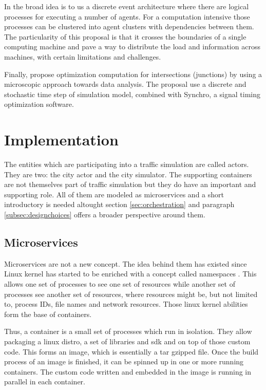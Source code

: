 \documentclass[conference]{IEEEtran}
\begin{document}
In \cite{8569576} the broad idea is to us a discrete event architecture where there are logical processes for executing a number of agents. For a computation intensive those processes can be clustered into agent clusters with dependencies between them. The particularity of this proposal is that it crosses the boundaries of a single computing machine and pave a way to distribute the load and information across machines, with certain limitations and challenges.

Finally, \cite{6244609} propose optimization computation for intersections (junctions) by using a microscopic approach towards data analysis. The proposal use a discrete and stochastic time step of simulation model, combined with Synchro, a signal timing optimization software.

\section{Implementation}
\label{sec:implementation}

The entities which are participating into a traffic simulation are called actors. They are two: the city actor and the city simulator. The supporting containers are not themselves part of traffic simulation but they do have an important and supporting role. All of them are modeled as microservices and a short introductory is needed altought section \ref{sec:orchestration} and paragraph \ref{subsec:designchoices} offers a broader perspective around them.

\subsection{Microservices}

Microservices are not a new concept. The idea behind them has existed since Linux kernel has started to be enriched with a concept called namespaces \citep{wiki:linuxns}. This allows one set of processes to see one set of resources while another set of processes see another set of resources, where resources might be, but not limited to, process IDs, file names and network resources. Those linux kernel abilities form the base of containers.

Thus, a container is a small set of processes which run in isolation. They allow packaging a linux distro, a set of libraries and sdk and on top of those custom code. This forms an image, which is essentially a tar gzipped file. Once the build process of an image is finished, it can be spinned up in one or more running containers. The custom code written and embedded in the image is running in parallel in each container.
\end{document}
